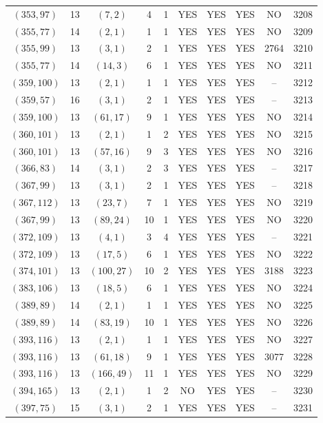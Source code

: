\begin{longtable}{|c|c|c|c|c|c|c|c|c|c|}
$(353, 97)$ & 13 & $(7, 2)$ & 4 & 1 & YES & YES & YES & NO & 3208\\
$(355, 77)$ & 14 & $(2, 1)$ & 1 & 1 & YES & YES & YES & NO & 3209\\
$(355, 99)$ & 13 & $(3, 1)$ & 2 & 1 & YES & YES & YES & 2764 & 3210\\
$(355, 77)$ & 14 & $(14, 3)$ & 6 & 1 & YES & YES & YES & NO & 3211\\
$(359, 100)$ & 13 & $(2, 1)$ & 1 & 1 & YES & YES & YES & -- & 3212\\
$(359, 57)$ & 16 & $(3, 1)$ & 2 & 1 & YES & YES & YES & -- & 3213\\
$(359, 100)$ & 13 & $(61, 17)$ & 9 & 1 & YES & YES & YES & NO & 3214\\
$(360, 101)$ & 13 & $(2, 1)$ & 1 & 2 & YES & YES & YES & NO & 3215\\
$(360, 101)$ & 13 & $(57, 16)$ & 9 & 3 & YES & YES & YES & NO & 3216\\
$(366, 83)$ & 14 & $(3, 1)$ & 2 & 3 & YES & YES & YES & -- & 3217\\
$(367, 99)$ & 13 & $(3, 1)$ & 2 & 1 & YES & YES & YES & -- & 3218\\
$(367, 112)$ & 13 & $(23, 7)$ & 7 & 1 & YES & YES & YES & NO & 3219\\
$(367, 99)$ & 13 & $(89, 24)$ & 10 & 1 & YES & YES & YES & NO & 3220\\
$(372, 109)$ & 13 & $(4, 1)$ & 3 & 4 & YES & YES & YES & -- & 3221\\
$(372, 109)$ & 13 & $(17, 5)$ & 6 & 1 & YES & YES & YES & NO & 3222\\
$(374, 101)$ & 13 & $(100, 27)$ & 10 & 2 & YES & YES & YES & 3188 & 3223\\
$(383, 106)$ & 13 & $(18, 5)$ & 6 & 1 & YES & YES & YES & NO & 3224\\
$(389, 89)$ & 14 & $(2, 1)$ & 1 & 1 & YES & YES & YES & NO & 3225\\
$(389, 89)$ & 14 & $(83, 19)$ & 10 & 1 & YES & YES & YES & NO & 3226\\
$(393, 116)$ & 13 & $(2, 1)$ & 1 & 1 & YES & YES & YES & NO & 3227\\
$(393, 116)$ & 13 & $(61, 18)$ & 9 & 1 & YES & YES & YES & 3077 & 3228\\
$(393, 116)$ & 13 & $(166, 49)$ & 11 & 1 & YES & YES & YES & NO & 3229\\
$(394, 165)$ & 13 & $(2, 1)$ & 1 & 2 & NO & YES & YES & -- & 3230\\
$(397, 75)$ & 15 & $(3, 1)$ & 2 & 1 & YES & YES & YES & -- & 3231\\

\end{longtable}
